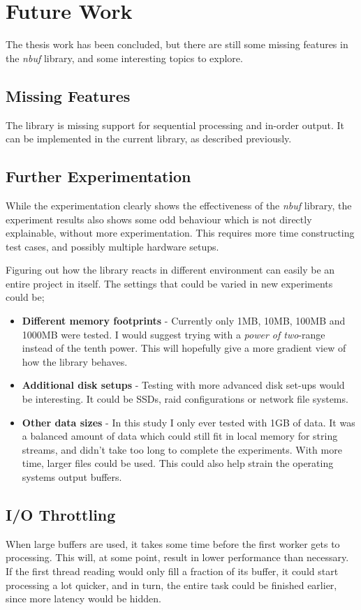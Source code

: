 \documentclass[a4paper]{article}
\newcommand{\nbuf}{\textit{nbuf} }
\begin{document}
\newpage
\section{Future Work}
The thesis work has been concluded, but there are still some missing features in the \nbuf library, and some interesting topics to explore. 

\subsection{Missing Features}
The library is missing support for sequential processing and in-order output. It can be implemented in the current library, as described previously.


\subsection{Further Experimentation}
While the experimentation clearly shows the effectiveness of the \nbuf library, the experiment results also shows some odd behaviour which is not directly explainable, without more experimentation. This requires more time constructing test cases, and possibly multiple hardware setups.

Figuring out how the library reacts in different environment can easily be an entire project in itself. The settings that could be varied in new experiments could be;

\begin{itemize}
\item \textbf{Different memory footprints} - Currently only 1MB, 10MB, 100MB and 1000MB were tested. I would suggest trying with a \textit{power of two}-range instead of the tenth power. This will hopefully give a more gradient view of how the library behaves.
\item \textbf{Additional disk setups} - Testing with more advanced disk set-ups would be interesting. It could be SSDs, raid configurations or network file systems.
\item \textbf{Other data sizes} - In this study I only ever tested with 1GB of data. It was a balanced amount of data which could still fit in local memory for string streams, and didn't take too long to complete the experiments. With more time, larger files could be used. This could also help strain the operating systems output buffers.
\end{itemize}


\subsection{I/O Throttling}
When large buffers are used, it takes some time before the first worker gets to processing. This will, at some point, result in lower performance than necessary. If the first thread reading would only fill a fraction of its buffer, it could start processing a lot quicker, and in turn, the entire task could be finished earlier, since more latency would be hidden.\\
\end{document}
